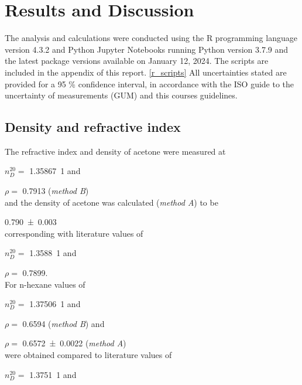 
\section{Results and Discussion}
The analysis and calculations were conducted using the R programming language \cite{R} version 4.3.2 and Python Jupyter Notebooks \cite{IPython:2007} running Python version 3.7.9 and the latest package versions available on January 12, 2024. The scripts are included in the appendix of this report. \ref{r_scripts} All uncertainties stated are provided for a 95 \% confidence interval, in accordance with the ISO guide to the uncertainty of measurements (GUM)\cite{GUM} and this courses guidelines\cite{meister}.


\subsection{Density and refractive index}

The refractive index and density of acetone were measured at 

$n_D^{20} =$ \qty{1.35867}{1} and 

$\rho = $ \qty{0.7913}{\density} (\textit{method B}) 
\\and the density of acetone was calculated (\textit{method A}) to be 

\qty{0.790 \pm 0.003}{\density} 
\\corresponding with literature values of 

$n_D^{20} =$ \qty{1.3588}{1} and 

$\rho = $ \qty{0.7899}{\density}. \cite{meister} 
\\For n-hexane values of 

$n_D^{20} =$ \qty{1.37506}{1} and 

$\rho = $ \qty{0.6594}{\density} (\textit{method B}) and 

$\rho = $ \qty{0.6572 \pm 0.0022}{\density} (\textit{method A}) 
\\were obtained compared to literature values of 

$n_D^{20} =$ \qty{1.3751}{1} and 

